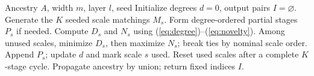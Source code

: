 \begin{algorithm}[t]
\caption{Deeper-layer stage selection}
\label{alg:construction}
\begin{algorithmic}
\REQUIRE Ancestry $A$, width $m$, layer $l$, seed
\STATE Initialize degrees $d=0$, output pairs $I=\varnothing$.
  \STATE Generate the $K$ seeded scale matchings $M_s$.
  \STATE Form degree-ordered partial stages $P_s$ if needed.
  \STATE Compute $D_s$ and $N_s$ using (\ref{eq:degree})--(\ref{eq:novelty}).
  \STATE Among unused scales, minimize $D_s$, then maximize $N_s$; break ties by nominal scale order.
  \STATE Append $P_s$; update $d$ and mark scale $s$ used.
  \STATE Reset used scales after a complete $K$-stage cycle.
\ENDWHILE
\STATE Propagate ancestry by union; return fixed indices $I$.
\end{algorithmic}
\end{algorithm}
